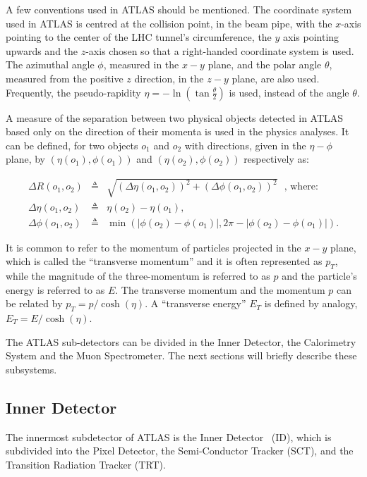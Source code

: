 A few conventions used in ATLAS should be mentioned.
The coordinate system~\cite{atlastdr1} used in ATLAS is centred at the collision point,
in the beam pipe, with
the $x$-axis pointing to the center of the LHC tunnel's circumference,
the $y$ axis pointing upwards and
the $z$-axis chosen so that a right-handed coordinate
system is used.
The azimuthal angle $\phi$, measured in the $x-y$ plane, and the polar angle
$\theta$, measured from the positive $z$ direction, in the $z - y$ plane, are
also used. Frequently,
the pseudo-rapidity $\eta = - \ln (\tan{\frac{\theta}{2}})$ is used, instead
of the angle $\theta$.

A measure of the separation between two physical objects detected in ATLAS based only on the direction of their momenta is used in
the physics analyses. It can be defined, for two objects $o_1$ and $o_2$ with directions, given in the $\eta - \phi$ plane, by $(\eta(o_1), \phi(o_1))$ and
$(\eta(o_2), \phi(o_2))$ respectively as:

\begin{eqnarray}
\displaystyle
\Delta R (o_1, o_2)&\triangleq&\sqrt{(\Delta \eta(o_1,o_2))^2 + (\Delta \phi(o_1, o_2))^2} \textrm{~~, where:} \\
\Delta \eta(o_1, o_2)&\triangleq&\eta(o_2) - \eta(o_1), \nonumber \\
\Delta \phi(o_1, o_2)&\triangleq&\min \left( \left|\phi(o_2) - \phi(o_1)\right|, 2\pi - \left|\phi(o_2) - \phi(o_1)\right|\right). \nonumber
\label{eq:deltaR}
\end{eqnarray}


It is common to refer to the momentum of particles projected in the $x-y$ plane, which
is called the ``transverse momentum'' and it is often represented as $p_T$, while the magnitude of the three-momentum is referred to as $p$ and
the particle's energy is referred to as $E$.
The transverse momentum and the momentum $p$ can be related by $p_T = p/\cosh(\eta)$.
A ``transverse energy'' $E_T$ is defined by analogy, $E_T = E/\cosh(\eta)$.

The ATLAS sub-detectors can be divided in the Inner Detector, the Calorimetry System and the Muon Spectrometer.
The next sections will briefly describe these subsystems.

\subsection{Inner Detector}

The innermost subdetector of ATLAS is the Inner Detector~\cite{idtdr,detpaper} (ID),
which is subdivided into
the Pixel Detector, the Semi-Conductor Tracker (SCT), and the
Transition Radiation Tracker (TRT).

